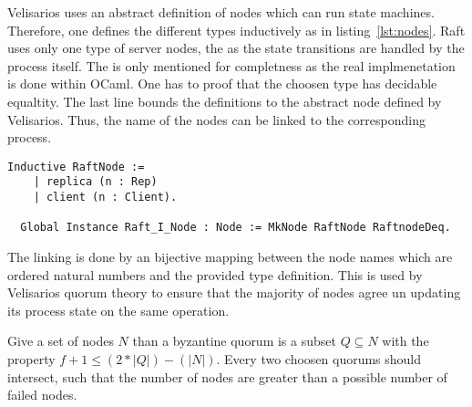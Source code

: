 Velisarios uses an abstract definition of nodes which can run state machines.
Therefore, one defines the different types inductively as in
listing~\ref{lst:nodes}. Raft uses only one type of server nodes, the
 as the state transitions are handled by the process itself.
The  is only mentioned for completness as the real implmenetation
is done within OCaml. One has to proof that the choosen type has decidable
equaltity. The last line bounds the definitions to the abstract node defined
by Velisarios. Thus, the name of the nodes can be linked to the corresponding
process. 

\begin{lstlisting}[style=coq,label=lst:nodes,
caption=The different kinds of raft nodes.]
  Inductive RaftNode :=
    | replica (n : Rep)
    | client (n : Client).

  Global Instance Raft_I_Node : Node := MkNode RaftNode RaftnodeDeq.
\end{lstlisting}

The linking is done by an bijective mapping between the node names which are
ordered natural numbers and the provided type definition. This is used by
Velisarios quorum theory to ensure that the majority of nodes agree
un updating its process state on the same operation.~\cite{rahli2018velisarios}

\begin{defi}
  Give a set of nodes $N$ than a byzantine quorum is a subset $Q\subseteq N$ with the
  property $f + 1\leq (2*|Q|)-(|N|)$. Every two choosen quorums should intersect,
  such that the number of nodes are greater than a possible number of failed
  nodes.
\end{defi}



